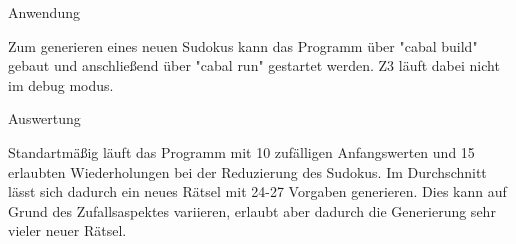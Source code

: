 \vspace{2ex}

\begin{Large}
    Anwendung
\end{Large}
\vspace{2ex}

Zum generieren eines neuen Sudokus kann das Programm über "cabal build" gebaut und anschließend über "cabal run" gestartet werden. Z3 läuft dabei nicht im debug modus.

\vspace{2ex}

\begin{Large}
    Auswertung
\end{Large}
\vspace{2ex}

Standartmäßig läuft das Programm mit 10 zufälligen Anfangswerten und 15 erlaubten Wiederholungen bei der Reduzierung des Sudokus.
Im Durchschnitt lässt sich dadurch ein neues Rätsel mit 24-27 Vorgaben generieren. Dies kann auf Grund des Zufallsaspektes variieren, erlaubt aber dadurch die Generierung sehr vieler neuer Rätsel.



